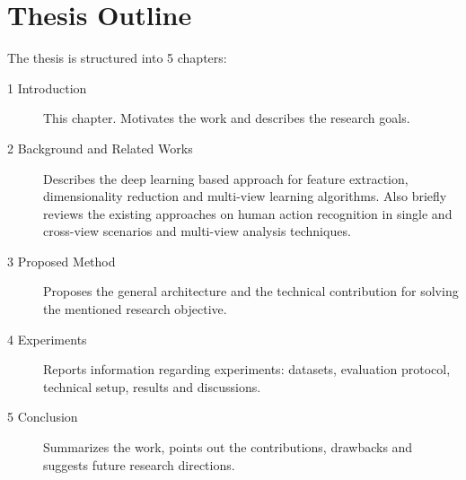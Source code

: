     \section{Thesis Outline} \label{sec:intro_outline}
        The thesis is structured into 5 chapters:
        \begin{description}
            \item[1 Introduction] This chapter. Motivates the work and describes the research goals.
            \item[2 Background and Related Works] Describes the deep learning based approach for feature extraction, dimensionality reduction and multi-view learning algorithms. Also briefly reviews the existing approaches on human action recognition in single and cross-view scenarios and multi-view analysis techniques.
            \item[3 Proposed Method] Proposes the general architecture and the technical contribution for solving the mentioned research objective.
            \item[4 Experiments] Reports information regarding experiments: datasets, evaluation protocol, technical setup, results and discussions.
            \item[5 Conclusion] Summarizes the work, points out the contributions, drawbacks and suggests future research directions.
        \end{description}
